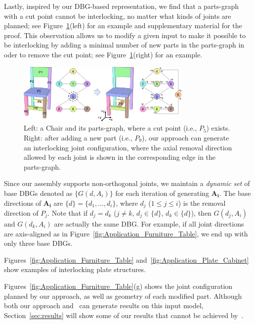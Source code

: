 Lastly, inspired by our DBG-based representation, we find that a parts-graph with a cut point cannot be interlocking, no matter what kinds of joints are planned; see Figure~\ref{fig:Result_Furniture_Chair}(left) for an example and supplementary material for the proof.
This observation allows us to modify a given input to make it possible to be interlocking by adding a minimal number of new parts in the parts-graph in oder to remove the cut point; see Figure~\ref{fig:Result_Furniture_Chair}(right) for an example.

\begin{figure}[!t]
	\centering
	\includegraphics[width=8.45cm]{images/Result_Furniture_Chair.png}
	\vspace*{-2.5mm}
	\caption{
		Left: a {\textsc Chair} and its parts-graph, where a cut point (i.e., $P_5$) exists.
		Right: after adding a new part (i.e., $P_9$), our approach can generate an interlocking joint configuration, where the axial removal direction allowed by each joint is shown in the corresponding edge in the parts-graph. 
	}
	\vspace*{-4.5mm}
	\label{fig:Result_Furniture_Chair}
\end{figure}







 Since our assembly supports non-orthogonal joints, we maintain a {\em dynamic set} of base DBGs denoted as $\{G(d, A_i)\}$ for each iteration of generating $\mathbf{A_i}$. The base directions of $\mathbf{A_i}$ are $\{d\} = \{d_1, ..., d_i\}$, where $d_j$ ($1 \leq  j \leq i$) is the removal direction of $P_j$.
Note that if $d_j = d_k$ ($j\neq k$, $d_j \in \{d\}$, $d_k \in \{d\}$), then $G(d_j, A_i)$ and $G(d_k, A_i)$ are actually the same DBG. For example, if all joint directions are axis-aligned as in Figure~\ref{fig:Application_Furniture_Table}, we end up with only three base DBGs.


Figures~\ref{fig:Application_Furniture_Table} and~\ref{fig:Application_Plate_Cabinet} show examples of interlocking plate structures. 

Figures~\ref{fig:Application_Furniture_Table}(g) shows the joint configuration planned by our approach, as well as geometry of each modified part.
Although both our approach and~\cite{Fu-2015-Furniture} can generate results on this input model, Section~\ref{sec:results} will show some of our results that cannot be achieved by~\cite{Fu-2015-Furniture}.


